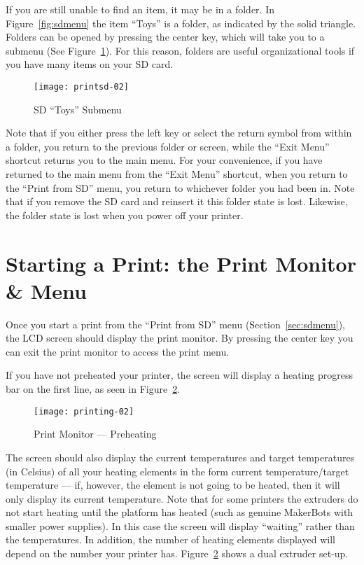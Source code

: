 If you are still unable to find an item, it may be in a folder.  In Figure~\ref{fig:sdmenu} the item ``Toys'' is a folder, as indicated by the solid triangle.
Folders can be opened by pressing the center key, which will take you to a submenu (See Figure~\ref{fig:submenu}).  For this reason, folders are useful organizational tools if you have many items on your SD card.

\begin{figure}[!htbp]
  \centering
    \texttt{[image: printsd-02]}
    \caption{SD ``Toys'' Submenu}
  \label{fig:submenu}
\end{figure}

Note that if you either press the left key or select the return symbol from within a folder, you return to the previous folder or screen, while the ``Exit Menu'' shortcut returns you to the main menu.  For your convenience, if you have returned to the main menu from the ``Exit Menu'' shortcut, when you return to the ``Print from SD'' menu, you return to whichever folder you had been in.  Note that if you remove the SD card and reinsert it this folder state is lost.  Likewise, the folder state is lost when you power off your printer.


\section{Starting a Print: the Print Monitor \& Menu}\label{sec:printmon}

Once you start a print from the ``Print from SD'' menu (Section~\ref{sec:sdmenu}), the LCD screen should display the print monitor.  By pressing the center key you can exit the print monitor to access the print menu.

If you have not preheated your printer, the screen will display a heating progress bar on the first line, as seen in Figure~\ref{fig:printpreheat}.

\begin{figure}[!htbp]
  \centering
    \texttt{[image: printing-02]}
    \caption{Print Monitor --- Preheating}
  \label{fig:printpreheat}
\end{figure}
  
The screen should also display the current temperatures and target temperatures (in Celsius) of all your heating elements in the form current temperature/target temperature --- if, however, the element is not going to be heated, then it will only display its current temperature.  Note that for some printers the extruders do not start heating until the platform has heated (such as genuine MakerBots with smaller power supplies).  In this case the screen will display ``waiting'' rather than the temperatures.  In addition, the number of heating elements displayed will depend on the number your printer has.  Figure~\ref{fig:printpreheat} shows a dual extruder set-up.

